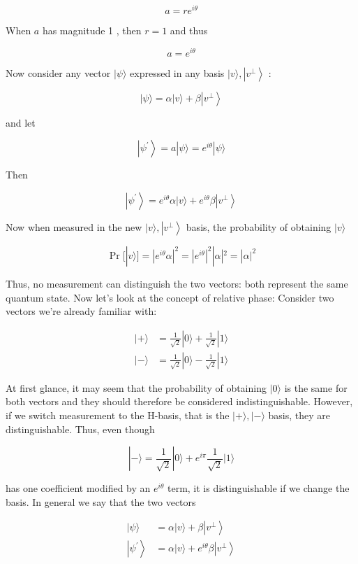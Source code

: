 \documentclass[main.tex]{subfiles}
\begin{document}
    $$
    a=r e^{i \theta}
    $$
    
    When $a$ has magnitude 1 , then $r=1$ and thus
    
    $$
    a=e^{i \theta}
    $$
    
    Now consider any vector $|\psi\rangle$ expressed in any basis $|v\rangle,\left|v^{\perp}\right\rangle$ :
    
    $$
    |\psi\rangle=\alpha|v\rangle+\beta\left|v^{\perp}\right\rangle
    $$
    
    and let
    
    $$
    \left|\psi^{\prime}\right\rangle=a|\psi\rangle=e^{i \theta}|\psi\rangle
    $$
    
    Then
    
    $$
    \left|\psi^{\prime}\right\rangle=e^{i \theta} \alpha|v\rangle+e^{i \theta} \beta\left|v^{\perp}\right\rangle
    $$
    
    Now when measured in the new $|v\rangle,\left|v^{\perp}\right\rangle$ basis, the probability of obtaining $|v\rangle$
    
    $$
    \operatorname{Pr}[|v\rangle]=\left|e^{i \theta} \alpha\right|^{2}=\left|e^{i \theta}\right|^{2}|\alpha|^{2}=|\alpha|^{2}
    $$
    
    Thus, no measurement can distinguish the two vectors: both represent the same quantum state. Now let's look at the concept of relative phase: Consider two vectors we're already familiar with:
    
    $$
    \begin{aligned}
    |+\rangle &=\frac{1}{\sqrt{2}}|0\rangle+\frac{1}{\sqrt{2}}|1\rangle \\
    |-\rangle &=\frac{1}{\sqrt{2}}|0\rangle-\frac{1}{\sqrt{2}}|1\rangle
    \end{aligned}
    $$
    
    At first glance, it may seem that the probability of obtaining $|0\rangle$ is the same for both vectors and they should therefore be considered indistinguishable. However, if we switch measurement to the H-basis, that is the $|+\rangle,|-\rangle$ basis, they are distinguishable. Thus, even though
    
    $$
    |-\rangle=\frac{1}{\sqrt{2}}|0\rangle+e^{i \pi} \frac{1}{\sqrt{2}}|1\rangle
    $$
    
    has one coefficient modified by an $e^{i \theta}$ term, it is distinguishable if we change the basis. In general we say that the two vectors
    
    $$
    \begin{aligned}
    |\psi\rangle &=\alpha|v\rangle+\beta\left|v^{\perp}\right\rangle \\
    \left|\psi^{\prime}\right\rangle &=\alpha|v\rangle+e^{i \theta} \beta\left|v^{\perp}\right\rangle
    \end{aligned}
    $$
    
\end{document}
